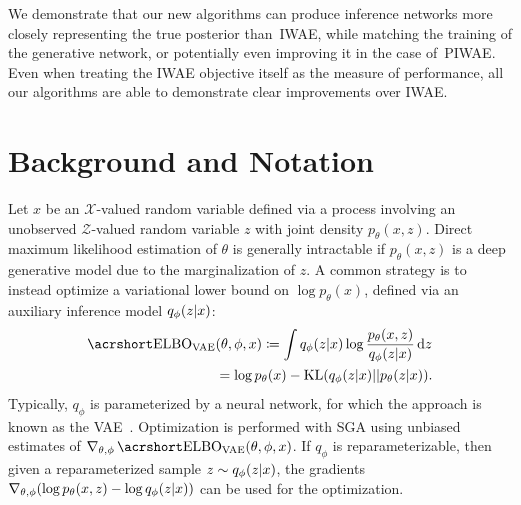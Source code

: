 We demonstrate that
our new algorithms can produce inference networks more closely representing the true posterior
than~\gls{IWAE}, while matching the
training of the generative network, or potentially even improving it in the case of~\gls{PIWAE}. 
Even when treating the \gls{IWAE} 
objective itself as the measure of performance, all our algorithms are able to demonstrate clear
improvements over \gls{IWAE}.

%

\section{Background and Notation}

Let $x$ be an $\mathcal{X}$-valued random variable defined via a process involving an unobserved $\mathcal{Z}$-valued random variable $z$ with joint density $p_{\theta}(x, z)$. Direct maximum likelihood estimation of $\theta$ is generally intractable if  $p_{\theta}(x, z)$ is a deep generative model due to the marginalization of $z$. A common strategy is to instead optimize a variational lower bound on $\log p_{\theta}(x)$, defined via an auxiliary inference model $q_{\phi}(z \lvert x)$:
\begin{align}
	\ELBO_{\text{VAE}} &(\theta, \phi, x) \coloneqq \int q_{\phi}(z \given x) \log \frac{p_{\theta}(x, z)} {q_{\phi}(z \given x)} \,\mathrm dz \nonumber \\
	&= \log p_{\theta}(x) - \mathrm{KL}(q_{\phi}(z \given x) || p_{\theta}(z \given x)). \label{eqn:intro/elbo_vae}
\end{align}
Typically, $q_{\phi}$ is parameterized by a neural network, for which the approach is known as the \gls{VAE}~\citep{kingma2014auto,rezende2014stochastic}. Optimization
is performed with \gls{SGA} using unbiased estimates of $\nabla_{\theta, \phi} \ELBO_{\text{VAE}}(\theta, \phi, x)$. If $q_{\phi}$ is reparameterizable, %
then given a reparameterized sample  $z \sim q_{\phi}(z  \lvert x)$, the gradients $\nabla_{\theta, \phi} (\log p_{\theta}(x, z) - \log q_{\phi}(z \lvert x))$ can be used for the 
optimization.


